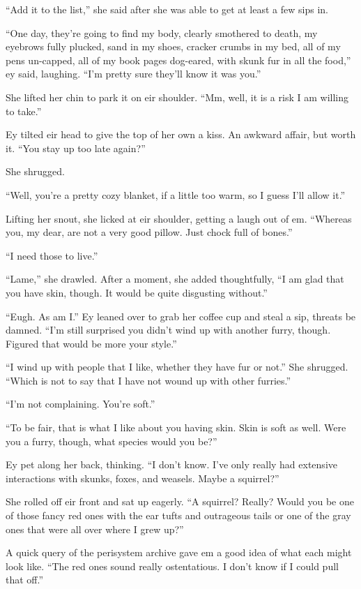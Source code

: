 ``Add it to the list,'' she said after she was able to get at least a few sips in.

``One day, they're going to find my body, clearly smothered to death, my eyebrows fully plucked, sand in my shoes, cracker crumbs in my bed, all of my pens un-capped, all of my book pages dog-eared, with skunk fur in all the food,'' ey said, laughing. ``I'm pretty sure they'll know it was you.''

She lifted her chin to park it on eir shoulder. ``Mm, well, it is a risk I am willing to take.''

Ey tilted eir head to give the top of her own a kiss. An awkward affair, but worth it. ``You stay up too late again?''

She shrugged.

``Well, you're a pretty cozy blanket, if a little too warm, so I guess I'll allow it.''

Lifting her snout, she licked at eir shoulder, getting a laugh out of em. ``Whereas you, my dear, are not a very good pillow. Just chock full of bones.''

``I need those to live.''

``Lame,'' she drawled. After a moment, she added thoughtfully, ``I am glad that you have skin, though. It would be quite disgusting without.''

``Eugh. As am I.'' Ey leaned over to grab her coffee cup and steal a sip, threats be damned. ``I'm still surprised you didn't wind up with another furry, though. Figured that would be more your style.''

``I wind up with people that I like, whether they have fur or not.'' She shrugged. ``Which is not to say that I have not wound up with other furries.''

``I'm not complaining. You're soft.''

``To be fair, that is what I like about you having skin. Skin is soft as well. Were you a furry, though, what species would you be?''

Ey pet along her back, thinking. ``I don't know. I've only really had extensive interactions with skunks, foxes, and weasels. Maybe a squirrel?''

She rolled off eir front and sat up eagerly. ``A squirrel? Really? Would you be one of those fancy red ones with the ear tufts and outrageous tails or one of the gray ones that were all over where I grew up?''

A quick query of the perisystem archive gave em a good idea of what each might look like. ``The red ones sound really ostentatious. I don't know if I could pull that off.''

